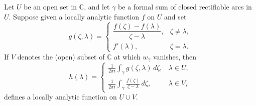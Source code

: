 Let $U$ be an open set in $\mathbb{C}$, and let $\gamma$ be a formal sum of closed rectifiable arcs in $U$. Suppose given a locally analytic function $f$ on $U$ and set
$$g(\zeta, \lambda) = \begin{cases} \dfrac{f(\zeta) - f(\lambda)}{\zeta - \lambda}, & \zeta \neq \lambda, \\[8pt] f'(\lambda), & \zeta = \lambda. \end{cases}$$
If $V$ denotes the (open) subset of $\mathbb{C}$ at which $w_{\gamma}$ vanishes, then
$$h(\lambda) = \begin{cases} \displaystyle \frac{1}{2\pi i} \int_{\gamma} g(\zeta, \lambda) \, d\zeta, & \lambda \in U, \\[10pt] \displaystyle \frac{1}{2\pi i} \int_{\gamma} \frac{f(\zeta)}{\zeta - \lambda} \, d\zeta, & \lambda \in V, \end{cases}$$
defines a locally analytic function on $U \cup V$.

